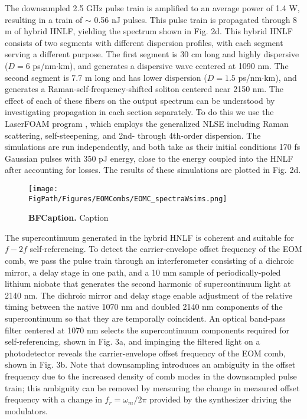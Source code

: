 The downsampled 2.5 GHz pulse train is amplified to an average power of 1.4 W, resulting in a train of $\sim$ 0.56 nJ pulses. This pulse train is propagated through 8 m of hybrid HNLF, yielding the spectrum shown in Fig. 2d. This hybrid HNLF consists of two segments with different dispersion profiles, with each segment serving a different purpose. The first segment is 30 cm long and highly dispersive ($D=6$  ps/nm$\cdot$km), and generates a dispersive wave centered at 1090 nm. The second segment is 7.7 m long and has lower dispersion ($D=1.5$  ps/nm$\cdot$km), and generates a Raman-self-frequency-shifted soliton centered near 2150 nm. The effect of each of these fibers on the output spectrum can be understood by investigating propagation in each section separately. To do this we use the LaserFOAM program \cite{Amorim2009}, which employs the generalized NLSE including Raman scattering, self-steepening, and 2nd- through 4th-order dispersion. The simulations are run independently, and both take as their initial conditions 170 fs Gaussian pulses with 350 pJ energy, close to the energy coupled into the HNLF after accounting for losses. The results of these simulations are plotted in Fig. 2d. 

\begin{figure}[htpb]
	\begin{center}
		\texttt{[image: \\FigPath/Figures/EOMCombs/EOMC\_spectraWsims.png]}
	\end{center}
	\caption[Figure Title]{\textbf{BFCaption.} Caption}
	\label{fig:PPConcept}
\end{figure} 

The supercontinuum generated in the hybrid HNLF is coherent and suitable for $f-2f$ self-referencing. To detect the carrier-envelope offset frequency of the EOM comb, we pass the pulse train through an interferometer consisting of a dichroic mirror, a delay stage in one path, and a 10 mm sample of periodically-poled lithium niobate that generates the second harmonic of supercontinuum light at 2140 nm.  The dichroic mirror and delay stage enable adjustment of the relative timing between the native 1070 nm and doubled 2140 nm components of the supercontinuum so that they are temporally coincident. An optical band-pass filter centered at 1070 nm selects the supercontinuum components required for self-referencing, shown in Fig. 3a, and impinging the filtered light on a photodetector reveals the carrier-envelope offset frequency of the EOM comb, shown in Fig. 3b. Note that downsampling introduces an ambiguity in the offset frequency due to the increased density of comb modes in the downsampled pulse train; this ambiguity can be removed by measuring the change in measured offset frequency with a change in $f_r=\omega_m/2\pi$ provided by the synthesizer driving the modulators. 




